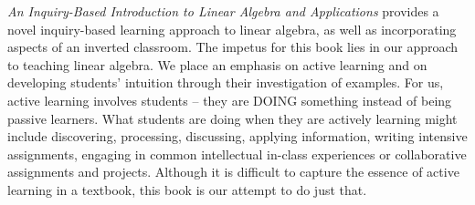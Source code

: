 \label{sec:pref_goals}

 \emph{An Inquiry-Based Introduction to Linear Algebra and Applications} provides a novel inquiry-based learning approach to linear algebra, as well as incorporating aspects of an inverted classroom. The impetus for this book lies in our approach to teaching linear algebra. We place an emphasis on active learning and on developing students' intuition through their investigation of examples. For us, active learning involves students -- they are DOING something instead of being passive learners. What students are doing when they are actively learning might include discovering, processing, discussing, applying information, writing intensive assignments, engaging in common intellectual in-class experiences or collaborative assignments and projects. Although it is difficult to capture the essence of active learning in a textbook, this book is our attempt to do just that.
 

